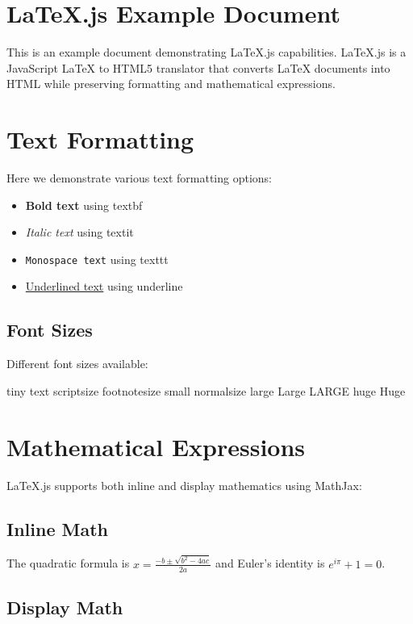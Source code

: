 \documentclass{article}
\begin{document}
\section{LaTeX.js Example Document}

This is an example document demonstrating LaTeX.js capabilities. LaTeX.js is a JavaScript LaTeX to HTML5 translator that converts LaTeX documents into HTML while preserving formatting and mathematical expressions.

\section{Text Formatting}

Here we demonstrate various text formatting options:

\begin{itemize}
\item \textbf{Bold text} using textbf
\item \textit{Italic text} using textit
\item \texttt{Monospace text} using texttt
\item \underline{Underlined text} using underline
\end{itemize}

\subsection{Font Sizes}

Different font sizes available:

{\tiny tiny text} {\scriptsize scriptsize} {\footnotesize footnotesize} {\small small} 
{\normalsize normalsize} {\large large} {\Large Large} {\LARGE LARGE} {\huge huge} {\Huge Huge}

\section{Mathematical Expressions}

LaTeX.js supports both inline and display mathematics using MathJax:

\subsection{Inline Math}

The quadratic formula is $x = \frac{-b \pm \sqrt{b^2 - 4ac}}{2a}$ and Euler's identity is $e^{i\pi} + 1 = 0$.

\subsection{Display Math}
\end{document}

